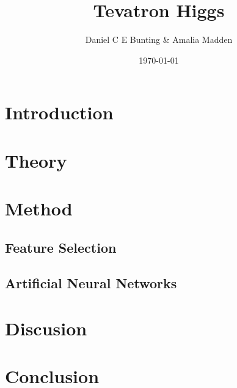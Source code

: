 \documentclass{article}
\title{Tevatron Higgs}
\author{ Daniel C E Bunting \& Amalia Madden}
\date{\today}
\begin{document}
\maketitle
\begin{abstract}
\end{abstract}

\section{Introduction} %
\label{sec:introduction}


\section{Theory} %
\label{sec:theory}





\section{Method} %
\label{sec:method}

\subsection{Feature Selection} %
\label{sub:feature_selection}

\subsection{Artificial Neural Networks} %
\label{sub:artificial_neural_networks}



\section{Discusion} %
\label{sec:discusion}


\section{Conclusion} %
\label{sec:conclusion}






 

\clearpage
\end{document}
